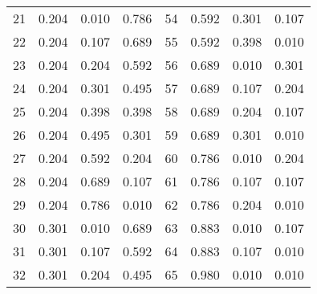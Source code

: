 \documentclass[journal=mamobx,manuscript=suppinfo]{achemso}
\begin{document}
\begin{longtable}{cccc|cccc}
21 & 0.204 & 0.010 & 0.786 & 54 & 0.592 & 0.301 & 0.107 \\
22 & 0.204 & 0.107 & 0.689 & 55 & 0.592 & 0.398 & 0.010 \\
23 & 0.204 & 0.204 & 0.592 & 56 & 0.689 & 0.010 & 0.301 \\
24 & 0.204 & 0.301 & 0.495 & 57 & 0.689 & 0.107 & 0.204 \\
25 & 0.204 & 0.398 & 0.398 & 58 & 0.689 & 0.204 & 0.107 \\
26 & 0.204 & 0.495 & 0.301 & 59 & 0.689 & 0.301 & 0.010 \\
27 & 0.204 & 0.592 & 0.204 & 60 & 0.786 & 0.010 & 0.204 \\
28 & 0.204 & 0.689 & 0.107 & 61 & 0.786 & 0.107 & 0.107 \\
29 & 0.204 & 0.786 & 0.010 & 62 & 0.786 & 0.204 & 0.010 \\
30 & 0.301 & 0.010 & 0.689 & 63 & 0.883 & 0.010 & 0.107 \\
31 & 0.301 & 0.107 & 0.592 & 64 & 0.883 & 0.107 & 0.010 \\
32 & 0.301 & 0.204 & 0.495 & 65 & 0.980 & 0.010 & 0.010 \\
\hline
\end{longtable}
\end{document}
